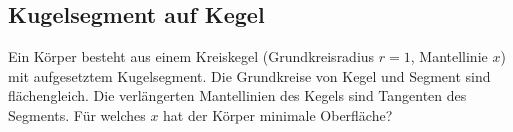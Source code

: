 \subsection{Kugelsegment auf Kegel}
Ein Körper besteht aus einem Kreiskegel (Grundkreisradius $r=1$,
Mantellinie $x$) mit aufgesetztem Kugelsegment.
Die Grundkreise von Kegel und Segment sind flächengleich.
Die verlängerten Mantellinien des Kegels sind Tangenten des
Segments. Für welches $x$ hat der Körper minimale Oberfläche?






